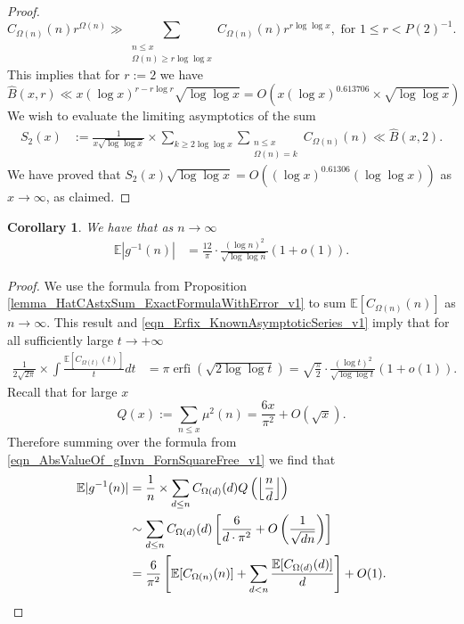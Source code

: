 \documentclass[11pt,reqno,a4letter]{article}
\numberwithin{figure}{section}
\numberwithin{table}{section}
\newcommand{\Floor}[2]{\ensuremath{\left\lfloor \frac{#1}{#2} \right\rfloor}}
\theoremstyle{plain}
\newtheorem{cor}[theorem]{Corollary}
\numberwithin{theorem}{section}
\theoremstyle{definition}
\begin{document}
\begin{proof}
\[     C_{\Omega(n)}(n) r^{\Omega(n)} \gg 
     \sum_{\substack{n \leq x \\ \Omega(n) \geq r\log\log x}} 
     C_{\Omega(n)}(n) r^{r \log\log x}, \text{\ for\ } 1 \leq r < P(2)^{-1}. 
\]
This implies that for $r := 2$ we have 
\begin{equation}
\label{eqn_BHatxrUpperBound_v1}
\widehat{B}(x, r) \ll x (\log x)^{r-r\log r} \sqrt{\log\log x} = 
     O\left(x (\log x)^{0.613706} \times \sqrt{\log\log x}\right)
\end{equation}
We wish to evaluate the limiting asymptotics of the sum 
\begin{align*}
S_2(x) & := \frac{1}{x \sqrt{\log\log x}} \times 
     \sum_{k \geq 2\log\log x} \sum_{\substack{n \leq x \\ \Omega(n)=k}} 
     C_{\Omega(n)}(n) \ll \widehat{B}(x, 2). 
\end{align*} 
We have proved that 
$S_2(x) \sqrt{\log\log x} = O\left((\log x)^{0.61306} (\log\log x)\right)$ 
as $x \rightarrow \infty$, as claimed. 
\end{proof} 

\begin{cor}
\label{cor_ExpectationFormulaAbsgInvn_v2} 
We have that as $n \rightarrow \infty$ 
\begin{align*} 
\mathbb{E}|g^{-1}(n)| & = \frac{12}{\pi} \cdot 
     \frac{(\log n)^2}{\sqrt{\log\log n}} (1+o(1)). 
\end{align*} 
\end{cor} 
\begin{proof} 
We use the formula from Proposition \ref{lemma_HatCAstxSum_ExactFormulaWithError_v1} 
to sum $\mathbb{E}[C_{\Omega(n)}(n)]$ as $n \rightarrow \infty$.
This result and \eqref{eqn_Erfix_KnownAsymptoticSeries_v1} 
imply that for all sufficiently large $t \rightarrow +\infty$ 
\begin{align*} 
\frac{1}{2 \sqrt{2\pi}} \times \int \frac{\mathbb{E}[C_{\Omega(t)}(t)]}{t} dt & = 
     \pi \operatorname{erfi}\left(\sqrt{2\log\log t}\right) = 
     \sqrt{\frac{\pi}{2}} \cdot \frac{(\log t)^2}{\sqrt{\log\log t}} (1+o(1)). 
\end{align*} 
Recall that for large $x$ 
\[
Q(x) := \sum_{n \leq x} \mu^2(n) = \frac{6x}{\pi^2} + O(\sqrt{x}). 
\]
Therefore summing over the formula from 
\eqref{eqn_AbsValueOf_gInvn_FornSquareFree_v1} we find that  
\begin{align} 
\notag 
\mathbb{E}|g^{-1}(n)| & = \frac{1}{n} \times \sum_{d \leq n} 
     C_{\Omega(d)}(d) Q\left(\Floor{n}{d}\right) \\ 
\notag 
     & \sim \sum_{d \leq n} C_{\Omega(d)}(d) \left[\frac{6}{d \cdot \pi^2} + O\left(\frac{1}{\sqrt{dn}}\right) 
     \right] \\ 
\notag 
     & = \frac{6}{\pi^2} \left[\mathbb{E}[C_{\Omega(n)}(n)] + \sum_{d<n} 
     \frac{\mathbb{E}[C_{\Omega(d)}(d)]}{d}\right] + O(1). 
     \qedhere 
\end{align} 
\end{proof} 
\end{document}

